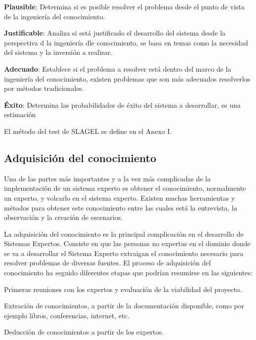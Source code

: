 \begin{compactitem}
  \item \textbf{Plausible}: Determina si es posible resolver el problema desde el
     punto de vista de la ingeniería del conocimiento.
  \item \textbf{Justificable}: Analiza si está justificado el desarrollo del
     sistema desde la perspectiva d la ingeniería dle conocimiento, se basa en
     temas como la necesidad del sistema y la inversión a realizar.
  \item \textbf{Adecuado}: Establece si el problema a resolver está dentro
     del marco de la ingeniería del conocimiento, existen problemas que son más
     adecuados resolverlos por métodos tradicionales.
  \item \textbf{Éxito}: Determina las probabilidades de éxito del sistema a
     desarrollar, es una estimación
\end{compactitem}

El método del test de SLAGEL se define en el Anexo I.


\subsection{Adquisición del conocimiento}

Una de las partes más importantes y a la vez más complicadas de la implementación
 de un sistema experto es obtener el conocimiento, normalmente un experto, y
 volcarlo en el sistema experto. Existen muchas herramientas y métodos para obtener
 este conocimiento entre las cuales está la entrevista, la observación y la creación
 de escenarios.

La adquisición del conocimiento es la principal complicación en el desarrollo de
 Sistemas Expertos. Consiste en que las personas no expertas en el dominio donde
 se va a desarrollar el Sistema Experto extraigan el conocimiento necesario para resolver
 problemas de diversas fuentes. El proceso de adquisición del conocimiento ha seguido
 diferentes etapas que podrían resumirse en las siguientes:

\begin{compactitem}
  \item Primeras reuniones con los expertos y evaluación de la viabilidad del proyecto.
  \item Extración de conocimientos, a partir de la documentación disponible, como
     por ejemplo libros, conferencias, internet, etc.
  \item Deducción de conocimientos a partir de los expertos.
\end{compactitem}

